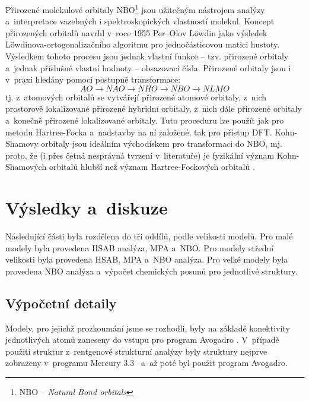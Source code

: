 \documentclass[
digital, %
table,   %
nolof,     %
nolot,     %
oneside,
]{fithesis3}
\begin{document}
Přirozené molekulové orbitaly NBO\footnote{NBO -- \textit{Natural Bond orbitals}} jsou užitečným nástrojem analýzy a~interpretace vazebných i spektroskopických vlastností molekul. Koncept přirozených orbitalů navrhl v~roce 1955 Per--Olov Löwdin jako výsledek Löwdinova-ortogonalizačního algoritmu pro jednočásticovou matici hustoty. Výsledkem tohoto procesu jsou jednak vlastní funkce -- tzv. přirozené orbitaly a~jednak příslušné vlastní hodnoty --  obsazovací čísla. Přirozené orbitaly jsou i v~praxi hledány pomocí postupné transformace:
\begin{displaymath}
AO \longrightarrow NAO \longrightarrow NHO \longrightarrow NBO \longrightarrow NLMO
\end{displaymath}
tj. z~atomových orbitalů se vytvářejí přirozené atomové orbitaly, z~nich prostorově lokalizované přirozené hybridní orbitaly, z~nich dále přirozené orbitaly  a~konečně přirozené lokalizované orbitaly. Tuto proceduru lze použít jak pro metodu Hartree-Focka a~nadstavby na ní založené, tak pro přístup DFT. Kohn-Shamovy orbitaly jsou ideálním východiskem pro transformaci do NBO, mj. proto, že (i přes četná nesprávná tvrzení v~literatuře) je fyzikální význam Kohn-Shamových orbitalů hlubší než význam Hartree-Fockových orbitalů \cite{Bickelhauptdftreview}.

\chapter{Výsledky a~diskuze}
Následující části byla rozdělena do tří oddílů, podle velikosti modelů. Pro malé modely byla provedena HSAB analýza, MPA a~NBO. Pro modely střední velikosti byla provedena HSAB, MPA a~NBO analýza. Pro velké modely byla provedena NBO analýza a~výpočet chemických posunů pro jednotlivé struktury.

\section{Výpočetní detaily}
Modely, pro jejichž prozkoumání jsme se rozhodli, byly na základě konektivity jednotlivých atomů zaneseny do vstupu pro program Avogadro \cite{Avogadro}. V~případě použití struktur z~rentgenové strukturní analýzy byly struktury nejprve zobrazeny v~programu Mercury 3.3~\cite{Mercury} a~až poté byl použit program Avogadro.
\end{document}
